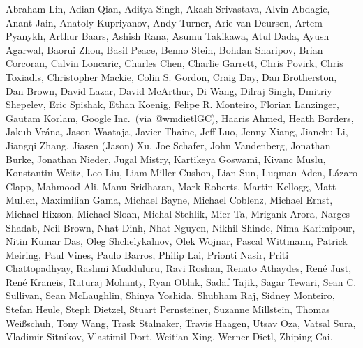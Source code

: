 Abraham Lin,
Adian Qian,
Aditya Singh,
Akash Srivastava,
Alvin Abdagic,
Anant Jain,
Anatoly Kupriyanov,
Andy Turner,
Arie van Deursen,
Artem Pyanykh,
Arthur Baars,
Ashish Rana,
Asumu Takikawa,
Atul Dada,
Ayush Agarwal,
Baorui Zhou,
Basil Peace,
Benno Stein,
Bohdan Sharipov,
Brian Corcoran,
Calvin Loncaric,
Charles Chen,
Charlie Garrett,
Chris Povirk,
Chris Toxiadis,
Christopher Mackie,
Colin S. Gordon,
Craig Day,
Dan Brotherston,
Dan Brown,
David Lazar,
David McArthur,
Di Wang,
Dilraj Singh,
Dmitriy Shepelev,
Eric Spishak,
Ethan Koenig,
Felipe R. Monteiro,
Florian Lanzinger,
Gautam Korlam,
Google Inc.\ (via @wmdietlGC),
Haaris Ahmed,
Heath Borders,
Jakub Vr\'ana,
Jason Waataja,
Javier Thaine,
Jeff Luo,
Jenny Xiang,
Jianchu Li,
Jiangqi Zhang,
Jiasen (Jason) Xu,
Joe Schafer,
John Vandenberg,
Jonathan Burke,
Jonathan Nieder,
Jugal Mistry,
Kartikeya Goswami,
Kivanc Muslu,
Konstantin Weitz,
Leo Liu,
Liam Miller-Cushon,
Lian Sun,
Luqman Aden,
L\'azaro Clapp,
Mahmood Ali,
Manu Sridharan,
Mark Roberts,
Martin Kellogg,
Matt Mullen,
Maximilian Gama,
Michael Bayne,
Michael Coblenz,
Michael Ernst,
Michael Hixson,
Michael Sloan,
Michal Stehlik,
Mier Ta,
Mrigank Arora,
Narges Shadab,
Neil Brown,
Nhat Dinh,
Nhat Nguyen,
Nikhil Shinde,
Nima Karimipour,
Nitin Kumar Das,
Oleg Shchelykalnov,
Olek Wojnar,
Pascal Wittmann,
Patrick Meiring,
Paul Vines,
Paulo Barros,
Philip Lai,
Prionti Nasir,
Priti Chattopadhyay,
Rashmi Mudduluru,
Ravi Roshan,
Renato Athaydes,
Ren\'e Just,
Ren\'e Kraneis,
Ruturaj Mohanty,
Ryan Oblak,
Sadaf Tajik,
Sagar Tewari,
Sean C. Sullivan,
Sean McLaughlin,
Shinya Yoshida,
Shubham Raj,
Sidney Monteiro,
Stefan Heule,
Steph Dietzel,
Stuart Pernsteiner,
Suzanne Millstein,
Thomas Wei\ss schuh,
Tony Wang,
Trask Stalnaker,
Travis Haagen,
Utsav Oza,
Vatsal Sura,
Vladimir Sitnikov,
Vlastimil Dort,
Weitian Xing,
Werner Dietl,
Zhiping Cai.
